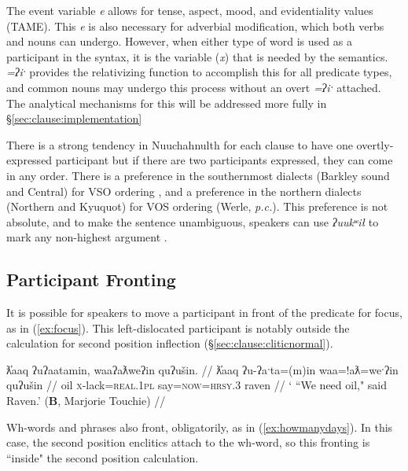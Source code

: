 The event variable \textit{e} allows for tense, aspect, mood, and evidentiality values (TAME). This \textit{e} is also necessary for adverbial modification, which both verbs and nouns can undergo. However, when either type of word is used as a participant in the syntax, it is the variable (\textit{x}) that is needed by the semantics. \textit{=ʔiˑ} provides the relativizing function to accomplish this for all predicate types, and common nouns may undergo this process without an overt \textit{=ʔiˑ} attached. The analytical mechanisms for this will be addressed more fully in \S\ref{sec:clause:implementation}


There is a strong tendency in Nuuchahnulth for each clause to have one overtly-expressed participant \citep[38]{rose1981} but if there are two participants expressed, they can come in any order. There is a preference in the southernmost dialects (Barkley sound and Central) for VSO ordering \citep[267]{jacobsen1993}, and a preference in the northern dialects (Northern and Kyuquot) for VOS ordering (Werle, \textit{p.c.}). This preference is not absolute, and to make the sentence unambiguous, speakers can use \textit{ʔuukʷił} to mark any non-highest argument \citep{woo2007b}.

\subsection{Participant Fronting}

It is possible for speakers to move a participant in front of the predicate for focus, as in (\ref{ex:focus}). This left-dislocated participant is notably outside the calculation for second position inflection (\S\ref{sec:clause:cliticnormal}).

\ex \label{ex:focus}
\begingl
\glpreamble ƛ̓aaq ʔuʔaatamin, waaʔaƛweʔin quʔušin. //
\gla ƛ̓aaq ʔu-ʔaˑta=(m)in waa=!aƛ=weˑʔin quʔušin //
\glb oil \textsc{x}-lack=\textsc{real.1pl} say=\textsc{now}=\textsc{hrsy.3} raven //
\glft ` ``We need oil," said Raven.' (\textbf{B}, Marjorie Touchie) //
\endgl
\xe

Wh-words and phrases also front, obligatorily, as in (\ref{ex:howmanydays}). In this case, the second position enclitics attach to the wh-word, so this fronting is ``inside" the second position calculation.

